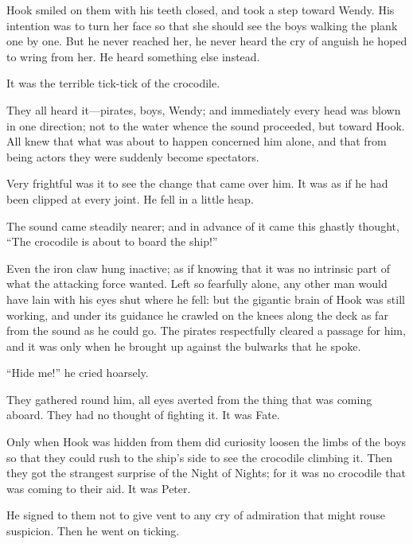 Hook smiled on them with his teeth closed, and took a step toward Wendy.
His intention was to turn her face so that she should see the boys walking the plank one by one.
But he never reached her,
he never heard the cry of anguish he hoped to wring from her.
He heard something else instead.

It was the terrible tick-tick of the crocodile.

They all heard it—pirates, boys, Wendy;
and immediately every head was blown in one direction;
not to the water whence the sound proceeded, but toward Hook.
All knew that what was about to happen concerned him alone,
and that from being actors they were suddenly become spectators.

Very frightful was it to see the change that came over him.
It was as if he had been clipped at every joint.
He fell in a little heap.

The sound came steadily nearer;
and in advance of it came this ghastly thought,
“The crocodile is about to board the ship!”

Even the iron claw hung inactive;
as if knowing that it was no intrinsic part of what the attacking force wanted.
Left so fearfully alone, any other man would have lain with his eyes shut where he fell:
but the gigantic brain of Hook was still working,
and under its guidance he crawled on the knees along the deck as far from the sound as he could go.
The pirates respectfully cleared a passage for him,
and it was only when he brought up against the bulwarks that he spoke.

“Hide me!\@” he cried hoarsely.

They gathered round him, all eyes averted from the thing that was coming aboard.
They had no thought of fighting it.
It was Fate.

Only when Hook was hidden from them did curiosity loosen the limbs of the boys
so that they could rush to the ship’s side to see the crocodile climbing it.
Then they got the strangest surprise of the Night of Nights;
for it was no crocodile that was coming to their aid.
It was Peter.

He signed to them not to give vent to any cry of admiration that might rouse suspicion.
Then he went on ticking.

\endinput
